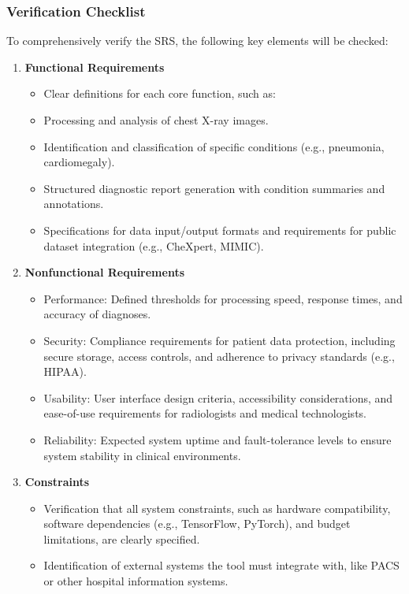 \documentclass[12pt, titlepage]{article}
\begin{document}
\subsubsection{Verification Checklist}
To comprehensively verify the SRS, the following key elements will be checked:
\begin{enumerate}
  \item \textbf{Functional Requirements}
    \begin{itemize}
      \item Clear definitions for each core function, such as:
      \item Processing and analysis of chest X-ray images.
      \item Identification and classification of specific conditions (e.g., pneumonia, cardiomegaly).
      \item Structured diagnostic report generation with condition summaries and annotations.
      \item Specifications for data input/output formats and requirements for public dataset integration (e.g., CheXpert, MIMIC).
    \end{itemize}
  \item \textbf{Nonfunctional Requirements}
    \begin{itemize}
      \item Performance: Defined thresholds for processing speed, response times, and accuracy of diagnoses.
      \item Security: Compliance requirements for patient data protection, including secure storage, access controls, and adherence to privacy standards (e.g., HIPAA).
      \item Usability: User interface design criteria, accessibility considerations, and ease-of-use requirements for radiologists and medical technologists.
      \item Reliability: Expected system uptime and fault-tolerance levels to ensure system stability in clinical environments.
    \end{itemize}
  \item \textbf{Constraints}
    \begin{itemize}
      \item Verification that all system constraints, such as hardware compatibility, software dependencies (e.g., TensorFlow, PyTorch), and budget limitations, are clearly specified.
      \item Identification of external systems the tool must integrate with, like PACS or other hospital information systems.

\end{itemize}
\end{enumerate}
\end{document}
